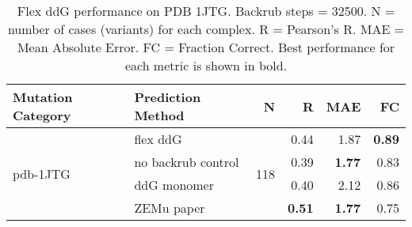 \begin{table}
  \begin{tabular}{llrrrr}
\toprule
Mutation Category &   Prediction Method &    N &    R &  MAE &   FC \\
\midrule
 \multirow{ 4}{*}{pdb-1JTG} & flex ddG & \multirow{ 4}{*}{118} & 0.44 & 1.87 & \textbf{0.89}  \\
 & no backrub control & & 0.39 & \textbf{1.77} & 0.83  \\
 & ddG monomer & & 0.40 & 2.12 & 0.86  \\
 & ZEMu paper & & \textbf{0.51} & \textbf{1.77} & 0.75  \\
\bottomrule
\end{tabular}
  \caption[Flex ddG performance on PDB 1JTG]{
    Flex ddG performance on PDB 1JTG. Backrub steps = 32500. N = number of cases (variants) for each complex. R = Pearson's R. MAE = Mean Absolute Error. FC = Fraction Correct. Best performance for each metric is shown in bold.
  } \label{tab:table-pdb-1JTG}
\end{table}
